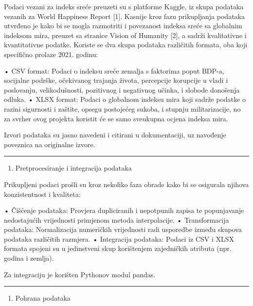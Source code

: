 \documentclass[11pt]{article}
\providecommand{\tightlist}{%
      \setlength{\itemsep}{0pt}\setlength{\parskip}{0pt}}
\begin{document}
Podaci vezani za indeks sreće preuzeti su s platforme Kaggle, iz skupa
podataka vezanih za World Happiness Report {[}1{]}. Kasnije kroz fazu
prikupljanja podataka utvrđeno je kako bi se mogla razmotriti i
povezanost indeksa sreće sa globalnim indeksom mira, preuzet sa stranice
Vision of Humanity {[}2{]}, a sadrži kvalitativne i kvantitativne
podatke. Koriste se dva skupa podataka različitih formata, oba koji
specifično prolaze 2021. godinu:

• CSV format: Podaci o indeksu sreće zemalja s faktorima poput BDP-a,
socijalne podrške, očekivanog trajanja života, percepcije korupcije u
vladi i poslovanju, velikodušnosti, pozitivnog i negativnog učinka, i
slobode donošenja odluka. • XLSX format: Podaci o globalnom indeksu mira
koji sadrže podatke o razini sigurnosti i zaštite, opsegu postojećeg
sukoba, i stupnju militarizacije, no za svrher ovog projekta koristit će
se samo sveukupna ocjena indeksa mira.

Izvori podataka su jasno navedeni i citirani u dokumentaciji, uz
navođenje poveznica na originalne izvore.

\begin{center}\rule{0.5\linewidth}{0.5pt}\end{center}

\begin{enumerate}
\def\labelenumi{\arabic{enumi}.}
\setcounter{enumi}{1}
\tightlist
\item
  Pretprocesiranje i integracija podataka
\end{enumerate}

Prikupljeni podaci prošli su kroz nekoliko faza obrade kako bi se
osigurala njihova konzistentnost i kvaliteta:

• Čišćenje podataka: Provjera dupliciranih i nepotpunih zapisa te
popunjavanje nedostajućih vrijednosti primjenom metoda interpolacije. •
Transformacija podataka: Normalizacija numeričkih vrijednosti radi
usporedbe između skupova podataka različitih razmjera. • Integracija
podataka: Podaci iz CSV i XLSX formata spojeni su u jedinstveni skup
korištenjem zajedničkih atributa (npr. godina i zemlja).

Za integraciju je korišten Pythonov modul pandas.

\begin{center}\rule{0.5\linewidth}{0.5pt}\end{center}

\begin{enumerate}
\def\labelenumi{\arabic{enumi}.}
\setcounter{enumi}{2}
\tightlist
\item
  Pohrana podataka
\end{enumerate}
\end{document}

